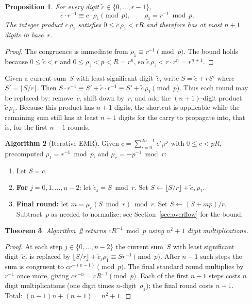 \documentclass[reqno]{amsart}
\newtheorem{theorem}{Theorem}[section]
\newtheorem{proposition}[theorem]{Proposition}
\theoremstyle{definition}
\newtheorem{algorithm}[theorem]{Algorithm}
\begin{document}
\begin{proposition}\label{prop:rho}
For every digit $\tilde c\in\{0,\ldots,r-1\}$,
\[
  \tilde c \cdot r^{-1} \equiv \tilde c \cdot \rho_1 \pmod p,
  \qquad \rho_1 = r^{-1} \bmod p.
\]
The integer product $\tilde c\,\rho_1$ satisfies $0\le \tilde c\,\rho_1 < rR$ and therefore has at most $n+1$ digits in base~$r$.
\end{proposition}

\begin{proof}
The congruence is immediate from $\rho_1\equiv r^{-1}\pmod p$.
The bound holds because $0\le \tilde c< r$ and $0\le \rho_1<p<R=r^n$, so $\tilde c\,\rho_1<r\cdot r^n=r^{n+1}$.
\end{proof}

Given a current sum~$S$ with least significant digit~$\tilde c$, write $S = \tilde c + rS'$ where $S'=\lfloor S/r\rfloor$.
Then $S\cdot r^{-1} \equiv S' + \tilde c\cdot r^{-1} \equiv S' + \tilde c\,\rho_1 \pmod p$.
Thus each round may be replaced by: remove~$\tilde c$, shift down by~$r$, and add the $(n{+}1)$-digit product $\tilde c\,\rho_1$.
Because this product has $n+1$ digits, the shortcut is applicable while the remaining sum still has at least $n+1$ digits for the carry to propagate into, that is, for the first $n-1$ rounds.

\begin{algorithm}[Iterative EMR]\label{alg:improved}
Given $c=\sum_{i=0}^{2n-1}c'_i r^i$ with $0\le c<pR$, precomputed $\rho_1=r^{-1}\bmod p$, and $\mu_r=-p^{-1}\bmod r$:
\begin{enumerate}
\item Let $S=c$.
\item \textbf{For} $j=0,1,\ldots,n-2$: let $\tilde c_j = S\bmod r$.
  Set $S \leftarrow \lfloor S/r \rfloor + \tilde c_j\,\rho_1$.
\item \textbf{Final round:} let $m = \mu_r(S\bmod r)\bmod r$.  Set $S \leftarrow (S+mp)/r$.
  Subtract~$p$ as needed to normalize; see Section~\ref{sec:overflow} for the bound.
\end{enumerate}
\end{algorithm}

\begin{theorem}\label{thm:n2p1}
Algorithm~\ref{alg:improved} returns $cR^{-1}\bmod p$ using $n^2+1$ digit multiplications.
\end{theorem}

\begin{proof}
At each step $j\in\{0,\ldots,n-2\}$ the current sum~$S$ with least significant digit~$\tilde c_j$ is replaced by $\lfloor S/r\rfloor + \tilde c_j\rho_1 \equiv Sr^{-1}\pmod p$.
After $n-1$ such steps the sum is congruent to $cr^{-(n-1)}\pmod p$.
The final standard round multiplies by $r^{-1}$ once more, giving $cr^{-n} = cR^{-1}\pmod p$.
Each of the first $n-1$ steps costs $n$ digit multiplications (one digit times $n$-digit~$\rho_1$); the final round costs $n+1$.
Total: $(n-1)n+(n+1)=n^2+1$.
\end{proof}
\end{document}
